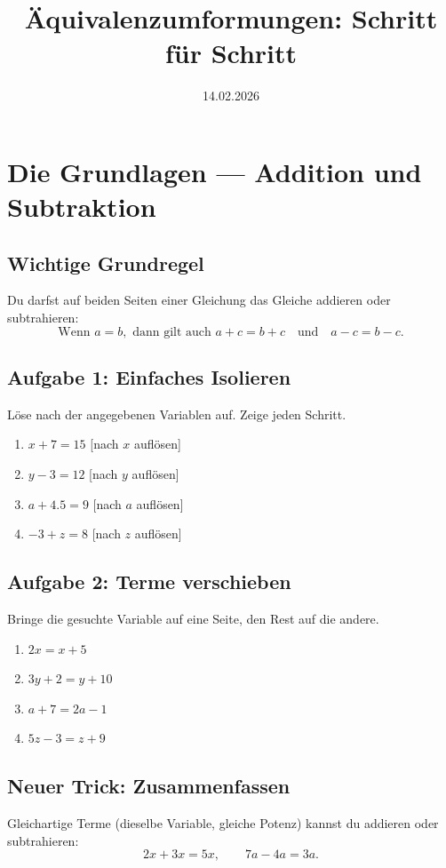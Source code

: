 \documentclass[12pt]{article}
\title{Äquivalenzumformungen: Schritt für Schritt}
\author{}
\date{14.02.2026}
\begin{document}
\maketitle

\section*{Die Grundlagen — Addition und Subtraktion}

\subsection*{Wichtige Grundregel}
Du darfst auf beiden Seiten einer Gleichung das Gleiche addieren oder subtrahieren:
\[
  \text{Wenn } a = b, \text{ dann gilt auch } a + c = b + c \quad \text{und} \quad a - c = b - c.
\]

\subsection*{Aufgabe 1: Einfaches Isolieren}
Löse nach der angegebenen Variablen auf. Zeige jeden Schritt.
\begin{enumerate}
  \item \(x + 7 = 15\) \hfill [nach \(x\) auflösen]
  \item \(y - 3 = 12\) \hfill [nach \(y\) auflösen]
  \item \(a + 4.5 = 9\) \hfill [nach \(a\) auflösen]
  \item \(-3 + z = 8\) \hfill [nach \(z\) auflösen]
\end{enumerate}

\subsection*{Aufgabe 2: Terme verschieben}
Bringe die gesuchte Variable auf eine Seite, den Rest auf die andere.
\begin{enumerate}
  \item \(2x = x + 5\)
  \item \(3y + 2 = y + 10\)
  \item \(a + 7 = 2a - 1\)
  \item \(5z - 3 = z + 9\)
\end{enumerate}

\subsection*{Neuer Trick: Zusammenfassen}
Gleichartige Terme (dieselbe Variable, gleiche Potenz) kannst du addieren oder subtrahieren:
\[
  2x + 3x = 5x, \qquad 7a - 4a = 3a.
\]
\end{document}
